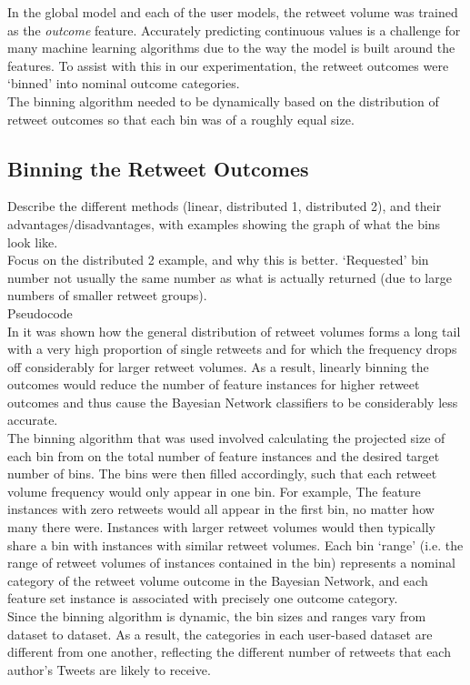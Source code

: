 In the global model and each of the user models, the retweet volume was trained as the \textit{outcome} feature.  Accurately predicting continuous values is a challenge for many machine learning algorithms due to the way the model is built around the features. To assist with this in our experimentation, the retweet outcomes were `binned' into nominal outcome categories.\\
The binning algorithm needed to be dynamically based on the distribution of retweet outcomes so that each bin was of a roughly equal size.


\subsection{Binning the Retweet Outcomes}
Describe the different methods (linear, distributed 1, distributed 2), and their advantages/disadvantages, with examples showing the graph of 
what the bins look like.
\\
Focus on the distributed 2 example, and why this is better.
`Requested' bin number not usually the same number as what is actually returned (due to large numbers of smaller retweet groups).
\\
Pseudocode\\

In \cite{webberley11} it was shown how the general distribution of retweet volumes forms a long tail with a very high proportion of single retweets and for which the frequency drops off considerably for larger retweet volumes. As a result, linearly binning the outcomes would reduce the number of feature instances for higher retweet outcomes and thus cause the Bayesian Network classifiers to be considerably less accurate.\\
The binning algorithm that was used involved calculating the projected size of each bin from on the total number of feature instances and the desired target number of bins. The bins were then filled accordingly, such that each retweet volume frequency would only appear in one bin. For example, The feature instances with zero retweets would all appear in the first bin, no matter how many there were. Instances with larger retweet volumes would then typically share a bin with instances with similar retweet volumes. Each bin `range' (i.e. the range of retweet volumes of instances contained in the bin) represents a nominal category of the retweet volume outcome in the Bayesian Network, and each feature set instance is associated with precisely one outcome category.\\
Since the binning algorithm is dynamic, the bin sizes and ranges vary from dataset to dataset. As a result, the categories in each user-based dataset are different from one another, reflecting the different number of retweets that each author's Tweets are likely to receive. 


